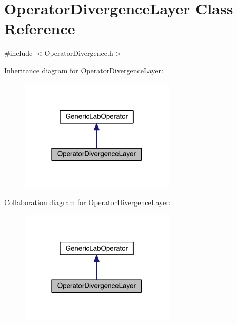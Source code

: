 \hypertarget{class_operator_divergence_layer}{}\section{Operator\+Divergence\+Layer Class Reference}
\label{class_operator_divergence_layer}


{\ttfamily \#include $<$Operator\+Divergence.\+h$>$}



Inheritance diagram for Operator\+Divergence\+Layer\+:\nopagebreak
\begin{figure}[H]
\begin{center}
\leavevmode
\includegraphics[width=211pt]{df/d10/class_operator_divergence_layer__inherit__graph}
\end{center}
\end{figure}


Collaboration diagram for Operator\+Divergence\+Layer\+:\nopagebreak
\begin{figure}[H]
\begin{center}
\leavevmode
\includegraphics[width=211pt]{d0/d90/class_operator_divergence_layer__coll__graph}
\end{center}
\end{figure}
